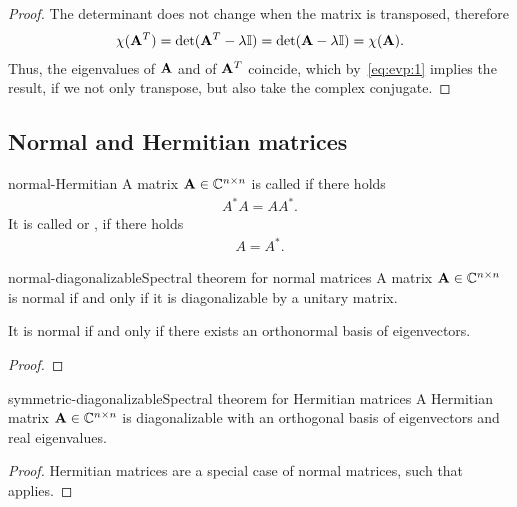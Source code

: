 \begin{proof}
  The determinant does not change when the matrix is transposed, therefore
  \begin{gather}
    \chi(\mathbf A^T)
    = \det(\mathbf A^T-\lambda \mathbb I)
    = \det(\mathbf A-\lambda \mathbb I)
    = \chi(\mathbf A).
  \end{gather}
  Thus, the eigenvalues of $\mathbf A$ and of $\mathbf A^T$ coincide, which
  by~\eqref{eq:evp:1} implies the result, if we not only transpose,
  but also take the complex conjugate.
\end{proof}

\subsection{Normal and Hermitian matrices}

\begin{Definition}{normal-Hermitian}
  A matrix $\mathbf A\in\mathbb C^{n\times n}$ is called  if there holds
  \begin{gather}
      A^*A = AA^*.
  \end{gather}
  It is called  or , if there holds
  \begin{gather}
      A=A^*.
  \end{gather}
\end{Definition}

\begin{Theorem*}{normal-diagonalizable}{Spectral theorem for normal matrices}
  A matrix $\mathbf A\in\mathbb C^{n\times n}$ is normal if and only if it is diagonalizable by a unitary matrix.
  
  It is normal if and only if there exists an orthonormal basis of eigenvectors.
\end{Theorem*}

\begin{proof}
  
\end{proof}

\begin{Corollary*}{symmetric-diagonalizable}{Spectral theorem for Hermitian matrices}
  A Hermitian matrix $\mathbf A\in\mathbb C^{n\times n}$ is diagonalizable with
  an orthogonal basis of eigenvectors and real eigenvalues.  
\end{Corollary*}

\begin{proof}
  Hermitian matrices are a special case of normal matrices, such that
   applies.
\end{proof}

